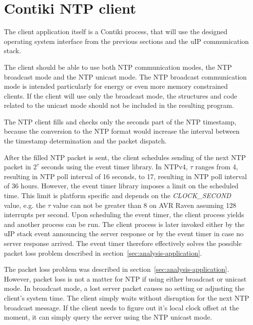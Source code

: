 
\section{Contiki NTP client}
The client application itself is a Contiki process,
that will use the designed operating system interface from the previous sections
and the uIP communication stack.

The client should be able to use both NTP communication modes,
the NTP broadcast mode and the NTP unicast mode.
The NTP broadcast communication mode is intended particularly for energy or
even more memory constrained clients.
If the client will use only the broadcast mode, the structures and code
related to the unicast mode should not be included in the resulting program.



The NTP client fills and checks only the seconds part of the NTP timestamp,
because the conversion to the NTP format would increase the interval
between the timestamp determination and the packet dispatch.

After the filled NTP packet is sent, the client schedules
sending of the next NTP packet in $2^{\tau}$ seconds
using the event timer library.
In NTPv4, $\tau$ ranges from 4, resulting in NTP poll interval of 16 seconds,
to 17, resulting in NTP poll interval of 36 hours.
However, the event timer library imposes a limit on the scheduled time.
This limit is platform specific and depends on the {\it{CLOCK\_SECOND}} value,
e.g. the $\tau$ value can not be greater than 8 on AVR Raven assuming 128 interrupts per second.
Upon scheduling the event timer, the client process yields
and another process can be run.
The client process is later invoked either by the uIP stack event
announcing the server response
or by the event timer in case no server response arrived.
The event timer therefore effectively solves
the possible packet loss problem described in section~\ref{sec:analysis-application}.


The packet loss problem was described in section~\ref{sec:analysis-application}.
However, packet loss is not a matter for NTP if using either broadcast or unicast mode.
In broadcast mode, a lost server packet causes no setting or adjusting the client's system time.
The client simply waits without disruption for the next NTP broadcast message.
If the client needs to figure out it's local clock offset at the moment,
it can simply query the server using the NTP unicast mode.

